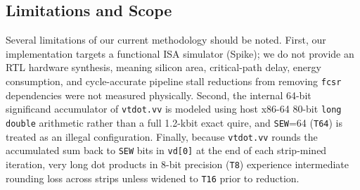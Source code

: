 \subsection{Limitations and Scope}
\label{sec:limitations}
Several limitations of our current methodology should be noted. First, our implementation targets a functional ISA simulator (Spike); we do not provide an RTL hardware synthesis, meaning silicon area, critical-path delay, energy consumption, and cycle-accurate pipeline stall reductions from removing \texttt{fcsr} dependencies were not measured physically. Second, the internal 64-bit significand accumulator of \texttt{vtdot.vv} is modeled using host x86-64 80-bit \texttt{long double} arithmetic rather than a full 1.2-kbit exact quire, and \texttt{SEW}=64 (\texttt{T64}) is treated as an illegal configuration. Finally, because \texttt{vtdot.vv} rounds the accumulated sum back to \texttt{SEW} bits in \texttt{vd[0]} at the end of each strip-mined iteration, very long dot products in 8-bit precision (\texttt{T8}) experience intermediate rounding loss across strips unless widened to \texttt{T16} prior to reduction.